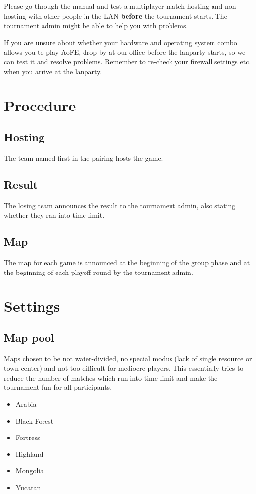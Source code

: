 \documentclass{article}
\begin{document}
Please go through the manual and test a multiplayer match hosting and non-hosting with other people in the LAN \textbf{before} the tournament starts. The tournament admin might be able to help you with problems.

If you are unsure about whether your hardware and operating system combo allows you to play AoFE, drop by at our office before the lanparty starts, so we can test it and resolve problems. Remember to re-check your firewall settings etc. when you arrive at the lanparty.

\section{Procedure}
\subsection{Hosting}
The team named first in the pairing hosts the game.
\subsection{Result}
The losing team announces the result to the tournament admin, also stating whether they ran into time limit.
\subsection{Map}
The map for each game is announced at the beginning of the group phase and at the beginning of each playoff round by the tournament admin.

\newpage

\section{Settings}
\subsection{Map pool}
Maps chosen to be not water-divided, no special modus (lack of single resource or town center) and not too difficult for mediocre players. This essentially tries to reduce the number of matches which run into time limit and make the tournament fun for all participants.
\begin{itemize}
\item Arabia
\item Black Forest
\item Fortress
\item Highland
\item Mongolia
\item Yucatan
\end{itemize}
\end{document}
